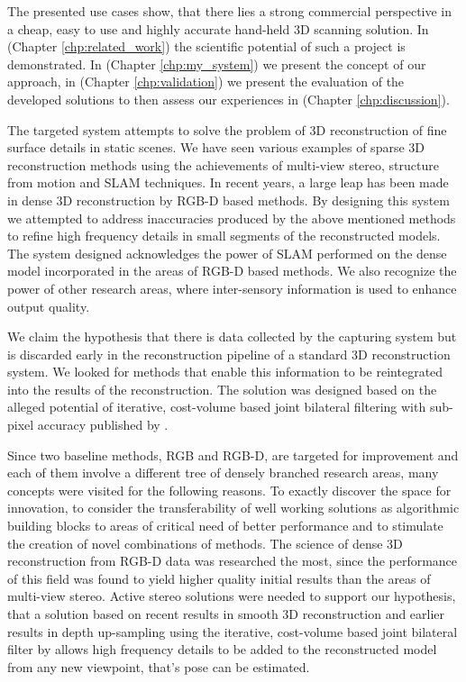 \documentclass{ucl_thesis}
\newcommand{\chpref}[1]{(Chapter \ref{#1})}
\begin{document}
\par The presented use cases show, that there lies a strong commercial perspective in a cheap, easy to use and highly accurate hand-held 3D scanning solution. In \chpref{chp:related_work} the scientific potential of such a project is demonstrated. In \chpref{chp:my_system} we present the concept of our approach, in \chpref{chp:validation} we present the evaluation of the developed solutions to then assess our experiences in \chpref{chp:discussion}.


\par The targeted system attempts to solve the problem of 3D reconstruction of fine surface details in static scenes. We have seen various examples of sparse 3D reconstruction methods using the achievements of multi-view stereo, structure from motion and SLAM techniques. In recent years, a large leap has been made in dense 3D reconstruction by RGB-D based methods. By designing this system we attempted to address inaccuracies produced by the above mentioned methods to refine high frequency details in small segments of the reconstructed models. The system designed acknowledges the power of SLAM performed on the dense model incorporated in the areas of RGB-D based methods. We also recognize the power of other research areas, where inter-sensory information is used to enhance output quality. 
\par We claim the hypothesis that there is data collected by the capturing system but is discarded early in the reconstruction pipeline of a standard 3D reconstruction system. We looked for methods that enable this information to be reintegrated into the results of the reconstruction. The solution was designed based on the alleged potential of iterative, cost-volume based joint bilateral filtering with sub-pixel accuracy published by \citep{cvpr-07-qingxiong-yang}.

Since two baseline methods, RGB and RGB-D, are targeted for improvement and each of them involve a different tree of densely branched research areas, many concepts were visited for the following reasons. To exactly discover the space for innovation, to consider the transferability of well working solutions as algorithmic building blocks to areas of critical need of better performance and to stimulate the creation of novel combinations of methods. The science of dense 3D reconstruction from RGB-D data was researched the most, since the performance of this field was found to yield higher quality initial results than the areas of multi-view stereo. Active stereo solutions were needed to support our hypothesis, that a solution based on recent results in smooth 3D reconstruction and earlier results in depth up-sampling using the iterative, cost-volume based joint bilateral filter by \cite{cvpr-07-qingxiong-yang} allows high frequency details to be added to the reconstructed model from any new viewpoint, that's pose can be estimated.
\end{document}
